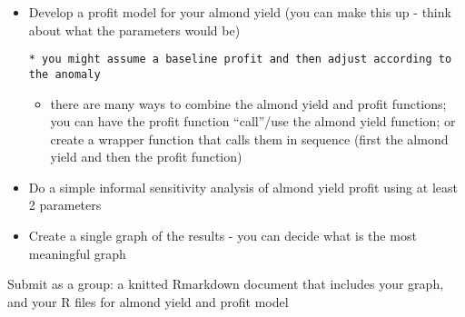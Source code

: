 \documentclass[
]{article}
\providecommand{\tightlist}{%
  \setlength{\itemsep}{0pt}\setlength{\parskip}{0pt}}
\begin{document}
\begin{itemize}
\item
  Develop a profit model for your almond yield (you can make this up -
  think about what the parameters would be)

\begin{verbatim}
* you might assume a baseline profit and then adjust according to the anomaly  
\end{verbatim}

  \begin{itemize}
  \tightlist
  \item
    there are many ways to combine the almond yield and profit
    functions; you can have the profit function ``call''/use the almond
    yield function; or create a wrapper function that calls them in
    sequence (first the almond yield and then the profit function)
  \end{itemize}
\item
  Do a simple informal sensitivity analysis of almond yield profit using
  at least 2 parameters
\item
  Create a single graph of the results - you can decide what is the most
  meaningful graph
\end{itemize}

Submit as a group: a knitted Rmarkdown document that includes your
graph, and your R files for almond yield and profit model
\end{document}
